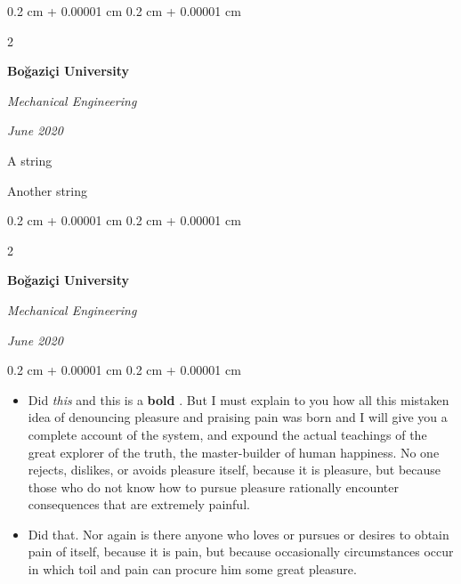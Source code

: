 \documentclass[10pt, letterpaper]{article}
\newenvironment{summary}{
    \begin{description}[
        topsep=0.10 cm,
        parsep=0.10 cm,
        partopsep=0pt,
        itemsep=0pt,
        leftmargin=0.4 cm + 10pt
    ]
}{
    \end{description}
} %
\newenvironment{highlights}{
    \begin{itemize}[
        topsep=0.10 cm,
        parsep=0.10 cm,
        partopsep=0pt,
        itemsep=0pt,
        leftmargin=0.4 cm + 10pt
    ]
}{
    \end{itemize}
} %
\newenvironment{onecolentry}{
    \begin{adjustwidth}{
        0.2 cm + 0.00001 cm
    }{
        0.2 cm + 0.00001 cm
    }
}{
    \end{adjustwidth}
} %
\newenvironment{twocolentry}[2][]{
    \onecolentry
    \def\secondColumn{#2}
    \setcolumnwidth{\fill, 4.5 cm}
    \begin{paracol}{2}
}{
    \switchcolumn \raggedleft \secondColumn
    \end{paracol}
    \endonecolentry
} %
\let\hrefWithoutArrow\href
\renewcommand{\href}[2]{\hrefWithoutArrow{#1}{\ifthenelse{\equal{#2}{}}{ }{#2 }\raisebox{.15ex}{\footnotesize \faExternalLink*}}}
\begin{document}
        \vspace{0.2 cm}

        \begin{twocolentry}{
            
            
        \textit{June 2020}}
            \textbf{Boğaziçi University}

            \textit{Mechanical Engineering}
        \end{twocolentry}
            \begin{summary}
                \item A string
                \item Another string
            \end{summary}


        \vspace{0.2 cm}

        \begin{twocolentry}{
            
            
        \textit{June 2020}}
            \textbf{Boğaziçi University}

            \textit{Mechanical Engineering}
        \end{twocolentry}
        \vspace{0.10 cm}
        \begin{onecolentry}
            \begin{highlights}
                \item Did \textit{this} and this is a \textbf{bold} \href{https://example.com}{link}. But I must explain to you how all this mistaken idea of denouncing pleasure and praising pain was born and I will give you a complete account of the system, and expound the actual teachings of the great explorer of the truth, the master-builder of human happiness. No one rejects, dislikes, or avoids pleasure itself, because it is pleasure, but because those who do not know how to pursue pleasure rationally encounter consequences that are extremely painful.
                \item Did that. Nor again is there anyone who loves or pursues or desires to obtain pain of itself, because it is pain, but because occasionally circumstances occur in which toil and pain can procure him some great pleasure.
            \end{highlights}
        \end{onecolentry}


        \vspace{0.2 cm}
\end{document}
